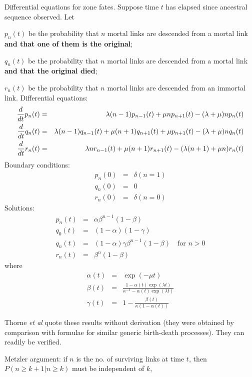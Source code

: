 \documentclass{beamer}
\begin{document}
\begin{frame}{}
\itemb
 \item Differential equations for zone fates. Suppose time $t$ has elapsed since ancestral sequence observed. Let
  \itemb
  \item $p_n(t)$ be the probability that $n$ mortal links are descended from a mortal link {\bf and that one of them is the original};
  \item $q_n(t)$ be the probability that $n$ mortal links are descended from a mortal link {\bf and that the original died};
  \item $r_n(t)$ be the probability that $n$ mortal links are descended from an immortal link.
  \iteme
Differential equations:
\begin{eqnarray*}
\frac{d}{d {t}} p_n(t) & = & \lambda (n-1) p_{n-1}(t) + \mu n p_{n+1}(t) - (\lambda + \mu) n p_n(t) \\
\frac{d}{d {t}} q_n(t) & = & \lambda (n-1) q_{n-1}(t) + \mu (n+1) q_{n+1}(t) + \mu p_{n+1}(t) - (\lambda + \mu) n q_n(t) \\
\frac{d}{d {t}} r_n(t) & = & \lambda n r_{n-1}(t) + \mu (n+1) r_{n+1}(t) - (\lambda (n+1) + \mu n) r_n(t)
\end{eqnarray*}
Boundary conditions:
\begin{eqnarray*}
p_n(0) & = & \delta (n = 1) \\
q_n(0) & = & 0 \\
r_n(0) & = & \delta (n = 0)
\end{eqnarray*}
Solutions:
\begin{eqnarray*}
p_n(t) & = & \alpha \beta^{n-1} (1-\beta) \\
q_0(t) & = & (1-\alpha) (1-\gamma) \\
q_n(t) & = & (1-\alpha) \gamma \beta^{n-1} (1-\beta) \quad \mbox{for $n>0$} \\
r_n(t) & = & \beta^n (1-\beta)
\end{eqnarray*}
where
\begin{eqnarray*}
\alpha(t) & = & \exp (-\mu t) \\
\beta(t) & = & \frac{1 - \alpha(t) \exp(\lambda t)}{\kappa^{-1} - \alpha(t) \exp(\lambda t)} \\
\gamma(t) & = & 1 - \frac{\beta(t)}{\kappa(1-\alpha(t))}
\end{eqnarray*}
 \item Thorne {\em et al} quote these results without derivation (they were obtained by comparison with formulae for similar generic birth-death processes).
They can readily be verified.
 \item Metzler argument: if $n$ is the no. of surviving links at time $t$, then $P(n \geq k+1|n \geq k)$ must be independent of $k$,

\end{frame}
\end{document}
